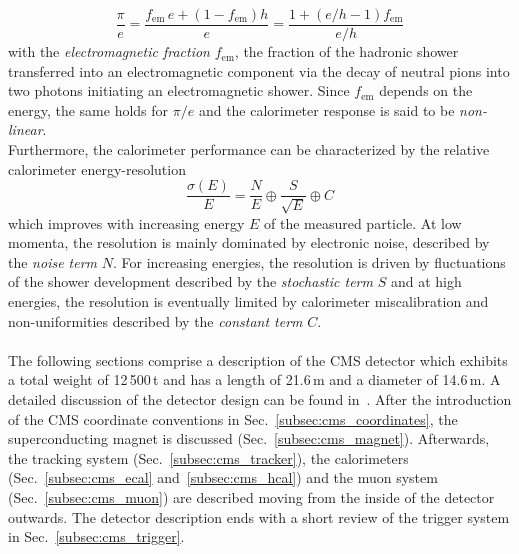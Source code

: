 \begin{equation}
\frac{\pi}{e} = \frac{f_\mathrm{em}\, e + (1 - f_\mathrm{em}) h}{e} = \frac{1+(e/h - 1) f_\mathrm{em}}{e/h}
\end{equation}
with the \textit{electromagnetic fraction} $f_\mathrm{em}$, \ie the fraction of the hadronic shower transferred into an electromagnetic component via the decay of neutral pions into two photons initiating an electromagnetic shower. Since $f_\mathrm{em}$ depends on the energy, the same holds for $\pi/e$ and the calorimeter response is said to be \textit{non-linear}. \\
Furthermore, the calorimeter performance can be characterized by the relative calorimeter energy-resolution
\begin{equation}
\frac{\sigma(E)}{E}= \frac{N}{E} \oplus \frac{S}{\sqrt{E}} \oplus C 
\end{equation}
which improves with increasing energy $E$ of the measured particle. At low momenta, the resolution is mainly dominated by electronic noise, described by the \textit{noise term} $N$. For increasing energies, the resolution is driven by fluctuations of the shower development described by the \textit{stochastic term} $S$ and at high energies, the resolution is eventually limited by calorimeter miscalibration and non-uniformities described by the \textit{constant term} $C$.\\ 
\\ 
The following sections comprise a description of the CMS detector which exhibits a total weight of 12\,500\,t and has a length of 21.6\,m and a diameter of 14.6\,m. A detailed discussion of the detector design can be found in~\cite{Chatrchyan:2008zzk, bib:cmsptdr1}. After the introduction of the CMS coordinate conventions in Sec.~\ref{subsec:cms_coordinates}, the superconducting magnet is discussed (Sec.~\ref{subsec:cms_magnet}). Afterwards, the tracking system (Sec.~\ref{subsec:cms_tracker}), the calorimeters (Sec.~\ref{subsec:cms_ecal} and~\ref{subsec:cms_hcal}) and the muon system (Sec.~\ref{subsec:cms_muon}) are described moving from the inside of the detector outwards. The detector description ends with a short review of the trigger system in Sec.~\ref{subsec:cms_trigger}.  

